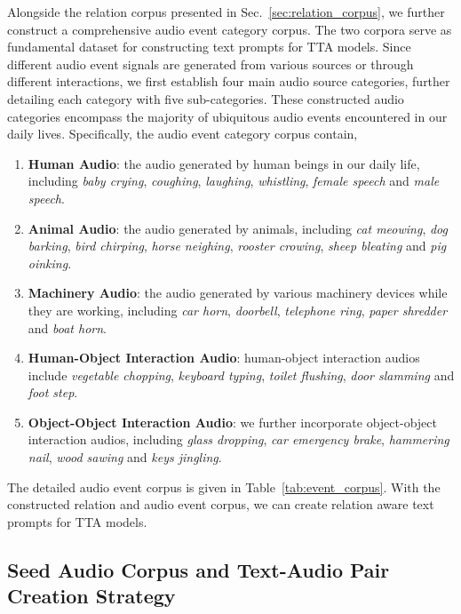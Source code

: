Alongside the relation corpus presented in Sec.~\ref{sec:relation_corpus}, we further construct a comprehensive audio event category corpus. The two corpora serve as fundamental dataset for constructing text prompts for TTA models. Since different audio event signals are generated from various sources or through different interactions, we first establish four main audio source categories, further detailing each category with five sub-categories. These constructed audio categories encompass the majority of ubiquitous audio events encountered in our daily lives. Specifically, the audio event category corpus contain,

\vspace{-2mm}
\begin{enumerate}[leftmargin=*]
    \item \textbf{Human Audio}: the audio generated by human beings in our daily life, including \textit{baby crying}, \textit{coughing}, \textit{laughing}, \textit{whistling}, \textit{female speech} and \textit{male speech}.
    \item \textbf{Animal Audio}: the audio generated by animals, including \textit{cat meowing}, \textit{dog barking}, \textit{bird chirping}, \textit{horse neighing}, \textit{rooster crowing}, \textit{sheep bleating} and \textit{pig oinking}.
    \item \textbf{Machinery Audio}: the audio generated by various machinery devices while they are working, including \textit{car horn}, \textit{doorbell}, \textit{telephone ring}, \textit{paper shredder} and \textit{boat horn}.
    \item \textbf{Human-Object Interaction Audio}: human-object interaction audios include \textit{vegetable chopping}, \textit{keyboard typing}, \textit{toilet flushing}, \textit{door slamming} and \textit{foot step}.
    \item \textbf{Object-Object Interaction Audio}: we further incorporate object-object interaction audios, including \textit{glass dropping}, \textit{car emergency brake}, \textit{hammering nail}, \textit{wood sawing} and \textit{keys jingling}.
\end{enumerate}
The detailed audio event corpus is given in Table~\ref{tab:event_corpus}. With the constructed relation and audio event corpus, we can create relation aware text prompts for TTA models.

\subsection{Seed Audio Corpus and Text-Audio Pair Creation Strategy}
\vspace{-2mm}
\label{sec:seed_audio_corpus}

